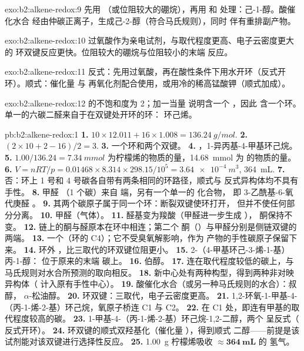\begin{solution}{exo:b2:alkene-redox:9}
先用 （或位阻较大的硼烷），再用  和  处理：己-1-醇。酸催化水合
经由仲碳正离子，生成己-2-醇（符合马氏规则），同时
伴有重排副产物。
\end{solution}

\begin{solution}{exo:b2:alkene-redox:10}
过氧酸作为亲电试剂，与取代程度更高、电子云密度更大的
环双键反应更快。位阻较大的硼烷与位阻较小的末端  反应。
\end{solution}

\begin{solution}{exo:b2:alkene-redox:11}
反式：先用过氧酸，再在酸性条件下用水开环（反式开环）。顺式：催化量  与
再氧化剂配合使用，或用冷的稀高锰酸钾（顺式加成）。
\end{solution}

\begin{solution}{exo:b2:alkene-redox:12}
 的不饱和度为 2；加一当量  说明含一个 ，因此
含一个环。单一的六碳二醛来自于在双键处开环的环：
环己烯。
\end{solution}

\begin{solution}{pb:b2:alkene-redox:1}
\textbf{1.} $10 \times 12.011 + 16 \times 1.008 = \qty{136.24}{g/mol}$.
\textbf{2.} $(2 \times 10 + 2 - 16)/2 = 3$.
\textbf{3.} 一个环和两个双键。
\textbf{4.} ，1-异丙基-4-甲基环己烷。
\textbf{5.} $1.00/136.24 = \qty{7.34}{mmol}$ 为柠檬烯的物质的量，\qty{14.68}{mmol} 为  的物质的量。
\textbf{6.} $V = nRT/p = 0.01468 \times 8.314 \times 298.15/10^5 = \qty{3.64e-4}{m^3}$,
\qty{364}{mL}.
\textbf{7.} 否：环上 1 号和 4 号碳各自带有两条相同的环路径，顺式与
反式异构体均不具有手性。
\textbf{8.} 甲醛 （1 个碳）来自  端，另有一个单一的  化合物，
即 3-乙酰基-6-氧代庚醛 。
\textbf{9.} 其两个碳原子属于同一个环：断裂双键使环打开，
但并不使任何部分分离。
\textbf{10.} 甲醛（气体）。
\textbf{11.} 醛基变为羧酸（甲醛进一步生成 ），
酮保持不变。
\textbf{12.}  链上的酮与醛原本在环中相连；第二个
酮（）与甲醛分别是侧链双键的两端。
\textbf{13.} 一个（环的 C4）；它不受臭氧解影响，作为
 产物的手性碳原子保留下来。
\textbf{14.} 环外 ，比三取代的环双键位阻更小。
\textbf{15.} 2-（4-甲基环己-3-烯-1-基）丙-1-醇： 位于原来的末端
碳上。
\textbf{16.} 伯醇。
\textbf{17.}  连在取代程度较低的碳上，与
马氏规则对水合所预测的取向相反。
\textbf{18.} 新中心处有两种构型，得到两种非对映异构体（
计入原有手性中心）。
\textbf{19.} 酸催化水合（或另一种马氏规则的水合）：叔醇，
$\alpha$-松油醇。
\textbf{20.} 环双键：三取代，电子云密度更高。
\textbf{21.} 1,2-环氧-1-甲基-4-（丙-1-烯-2-基）环己烷，氧原子桥连 C1 与 C2。
\textbf{22.} 在 C1 处，即连有甲基的取代程度较高的碳。
\textbf{23.} 1-甲基-4-（丙-1-烯-2-基）环己烷-1,2-二醇，两个  呈反式（
反式开环）。
\textbf{24.} 环双键的顺式双羟基化（催化量 ），得到顺式
二醇——前提是该试剂能对该双键进行选择性反应。
\textbf{25.} \qty{1.00}{g} 柠檬烯吸收 $\boldsymbol{\approx \qty{364}{mL}}$ 的
氢气。
\end{solution}
